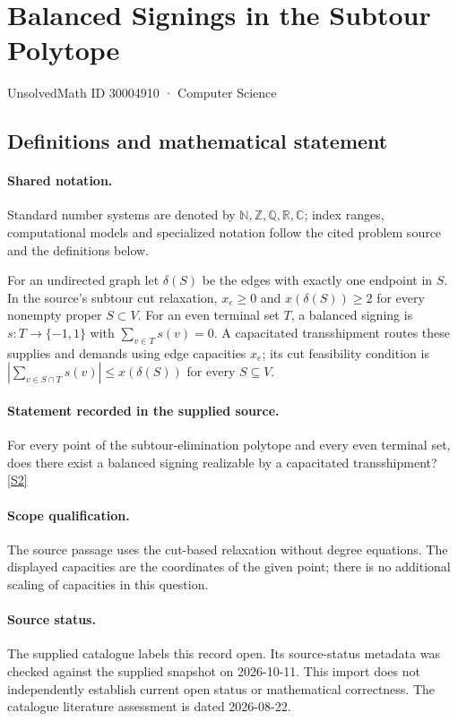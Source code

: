 \documentclass[11pt]{article}
\newcommand{\sref}[2]{\hyperlink{source:#1:#2}{[S#2]}}
\begin{document}
\setcounter{section}{30004909}
\section{Balanced Signings in the Subtour Polytope}\label{30004910}
{\small\sffamily UnsolvedMath ID 30004910 · Computer Science}
\subsection{Definitions and mathematical statement}

\paragraph{Shared notation.}Standard number systems are denoted by $\mathbb N,\mathbb Z,\mathbb Q,\mathbb R,\mathbb C$; index ranges, computational models and specialized notation follow the cited problem source and the definitions below.


For an undirected graph let $\delta(S)$ be the edges with exactly one endpoint in $S$. In the source's subtour cut relaxation, $x_e\geq0$ and $x(\delta(S))\geq2$ for every nonempty proper $S\subset V$. For an even terminal set $T$, a balanced signing is $s:T\to\{-1,1\}$ with $\sum_{v\in T}s(v)=0$. A capacitated transshipment routes these supplies and demands using edge capacities $x_e$; its cut feasibility condition is $|\sum_{v\in S\cap T}s(v)|\leq x(\delta(S))$ for every $S\subseteq V$.
\paragraph{Statement recorded in the supplied source.}
For every point of the subtour-elimination polytope and every even terminal set, does there exist a balanced signing realizable by a capacitated transshipment? \sref{30004910}{2}
\paragraph{Scope qualification.}
The source passage uses the cut-based relaxation without degree equations. The displayed capacities are the coordinates of the given point; there is no additional scaling of capacities in this question.
\paragraph{Source status.}
The supplied catalogue labels this record open. Its source-status metadata was checked against the supplied snapshot on 2026-10-11. This import does not independently establish current open status or mathematical correctness. The catalogue literature assessment is dated 2026-08-22.
\end{document}
